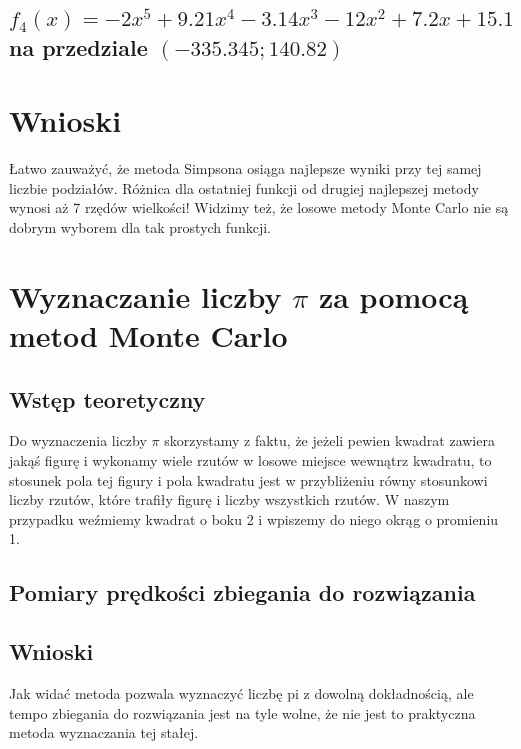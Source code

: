 \documentclass{article}
\begin{document}
    \subsection{$f_4(x) = -2x^5 + 9.21x^4 - 3.14x^3 -12x^2 + 7.2x + 15.1$ na przedziale $(-335.345; 140.82)$}

        \noindent

\section{Wnioski}
Łatwo zauważyć, że metoda Simpsona osiąga najlepsze wyniki przy tej samej liczbie podziałów. Różnica dla ostatniej funkcji od drugiej najlepszej metody wynosi aż 7 rzędów wielkości! Widzimy też, że losowe metody Monte Carlo nie są dobrym wyborem dla tak prostych funkcji.
\section{Wyznaczanie liczby $\pi$ za pomocą metod Monte Carlo}
\subsection{Wstęp teoretyczny}
Do wyznaczenia liczby $\pi$ skorzystamy z faktu, że jeżeli pewien kwadrat zawiera jakąś figurę i wykonamy wiele rzutów w losowe miejsce wewnątrz kwadratu, to stosunek pola tej figury i pola kwadratu jest w przybliżeniu równy stosunkowi liczby rzutów, które trafiły figurę i liczby wszystkich rzutów. W naszym przypadku weźmiemy kwadrat o boku 2 i wpiszemy do niego okrąg o promieniu 1.
\subsection{Pomiary prędkości zbiegania do rozwiązania}
    \noindent
\subsection{Wnioski}
Jak widać metoda pozwala wyznaczyć liczbę pi z dowolną dokładnością, ale tempo zbiegania do rozwiązania jest na tyle wolne, że nie jest to praktyczna metoda wyznaczania tej stałej.
\end{document}
